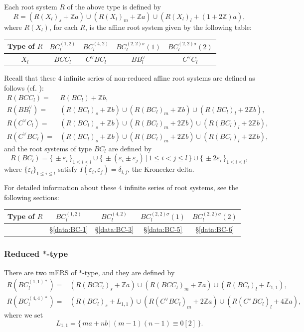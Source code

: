 \documentclass[11pt]{amsart}
\newcommand{\Z}{\mathbb{Z}}
\newcommand{\vep}{\varepsilon}
\begin{document}
Each root system $R$ of the above type is defined by
\[ R=(R(X_l)_s+\Z a) \cup (R(X_l)_m+\Z a) \cup (R(X_l)_l+(1+2\Z)a), \]
where $R(X_l)$, for each $R$, is the affine root system given by the following table:
\begin{center}
\begin{tabular}{|c||c|c|c|c|} \hline
Type of $R$ & $BC^{(1,2)}_l$ & $BC_l^{(4,2)}$ & $BC_l^{(2,2)\sigma}(1)$ & $BC_l^{(2,2)\sigma}(2)$ 
 \\ \hline
$X_l$ & $BCC_l$ & $C^\vee BC_l $ & $BB_l^\vee$ & $C^\vee C_l$  \\ \hline
\end{tabular}
\end{center}
Recall that these $4$ infinite series of non-reduced affine root systems are defined as follows (cf. \cite{Macdonald1972}):
\begin{align*}
R(BCC_l)=
&R(BC_l)+\Z b, \\
R(BB_l^\vee)=
&(R(BC_l)_s+\Z b) \cup (R(BC_l)_m+\Z b) \cup (R(BC_l)_l+2\Z b), \\
R(C^\vee C_l)=
&(R(BC_l)_s+\Z b) \cup (R(BC_l)_m+2\Z b) \cup (R(BC_l)_l+2\Z b), \\
R(C^\vee BC_l)=
&(R(BC_l)_s+\Z b) \cup (R(BC_l)_m+2\Z b) \cup (R(BC_l)_l+2\Z b),
\end{align*}
and the root systems of type $BC_l$ are defined by 
\[ R(BC_l)=\{ \, \pm \vep_i\, \}_{1\leq i\leq l} \cup \{ \, \pm (\vep_i\pm \vep_j)\, \vert \, 1\leq i<j\leq l\, \}
\cup \{ \, \pm 2\vep_i\, \}_{1\leq i\leq l}, \]
where $\{\vep_i\}_{1\leq i \leq l}$ satisfy $I(\vep_i,\vep_j)=\delta_{i,j}$, the Kronecker delta. 

For detailed information about these $4$ infinite series of root systems, see the following sections: \\
\begin{center}
\begin{tabular}{|c||c|c|c|c|} \hline
Type of $R$ & $BC^{(1,2)}_l$ & $BC_l^{(4,2)}$ & $BC_l^{(2,2)\sigma}(1)$ & $BC_l^{(2,2)\sigma}(2)$ 
 \\ \hline
 & \S \ref{data:BC-1} & \S \ref{data:BC-3} & \S \ref{data:BC-5} & \S \ref{data:BC-6}  \\ \hline
\end{tabular}
\end{center}

\subsubsection{Reduced $\ast$-type}\label{section:intro_red-star}
There are two mERS of $\ast$-type, and they are defined by
\begin{align*}
R(BC_l^{(1,1)\ast})=
&(R(BCC_l)_s+\Z a) \cup (R(BCC_l)_m+\Z a) \cup (R(BC_l)_l+L_{1,1}), \\
R(BC_l^{(4,4)\ast})=
&(R(BC_l)_s+L_{1,1}) \cup (R(C^\vee BC_l)_m+2\Z a) \cup (R(C^\vee BC_l)_l+4\Z a),
\end{align*}
where we set 
\[ L_{1,1}=\{ \, ma+nb\, \vert \, (m-1)(n -1) \equiv 0 [2]\, \}. \]
\end{document}
